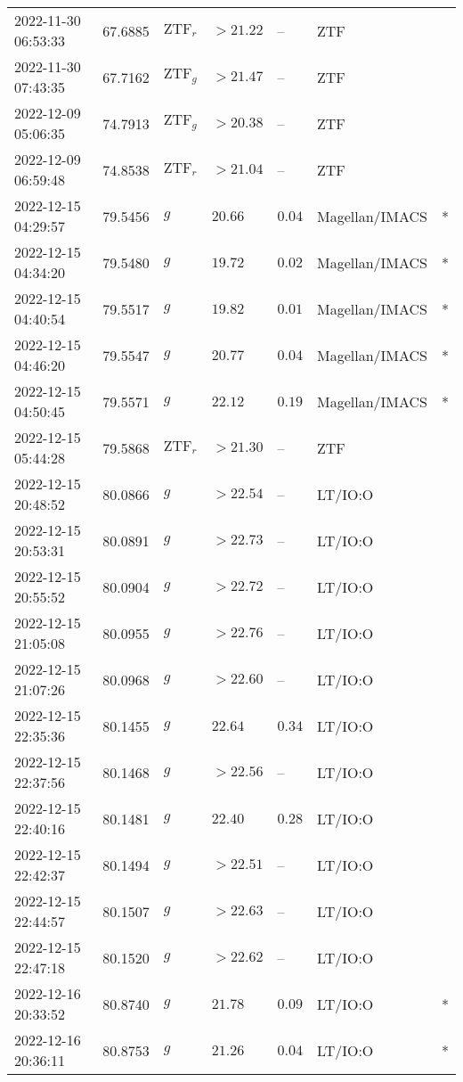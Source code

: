 \documentclass{nature_plusfigure}
\begin{document}
\begin{supplement}
\begin{center}
\begin{longtable}{lllllll}
2022-11-30 06:53:33 & 67.6885 & $\mathrm{ZTF}_{r}$ & $>21.22$ & -- & ZTF &  \\ 
2022-11-30 07:43:35 & 67.7162 & $\mathrm{ZTF}_{g}$ & $>21.47$ & -- & ZTF &  \\ 
2022-12-09 05:06:35 & 74.7913 & $\mathrm{ZTF}_{g}$ & $>20.38$ & -- & ZTF &  \\ 
2022-12-09 06:59:48 & 74.8538 & $\mathrm{ZTF}_{r}$ & $>21.04$ & -- & ZTF &  \\ 
2022-12-15 04:29:57 & 79.5456 & $g$ & $20.66$ & $0.04$ & Magellan/IMACS & * \\ 
2022-12-15 04:34:20 & 79.5480 & $g$ & $19.72$ & $0.02$ & Magellan/IMACS & * \\ 
2022-12-15 04:40:54 & 79.5517 & $g$ & $19.82$ & $0.01$ & Magellan/IMACS & * \\ 
2022-12-15 04:46:20 & 79.5547 & $g$ & $20.77$ & $0.04$ & Magellan/IMACS & * \\ 
2022-12-15 04:50:45 & 79.5571 & $g$ & $22.12$ & $0.19$ & Magellan/IMACS & * \\ 
2022-12-15 05:44:28 & 79.5868 & $\mathrm{ZTF}_{r}$ & $>21.30$ & -- & ZTF &  \\ 
2022-12-15 20:48:52 & 80.0866 & $g$ & $>22.54$ & -- & LT/IO:O &  \\ 
2022-12-15 20:53:31 & 80.0891 & $g$ & $>22.73$ & -- & LT/IO:O &  \\ 
2022-12-15 20:55:52 & 80.0904 & $g$ & $>22.72$ & -- & LT/IO:O &  \\ 
2022-12-15 21:05:08 & 80.0955 & $g$ & $>22.76$ & -- & LT/IO:O &  \\ 
2022-12-15 21:07:26 & 80.0968 & $g$ & $>22.60$ & -- & LT/IO:O &  \\ 
2022-12-15 22:35:36 & 80.1455 & $g$ & $22.64$ & $0.34$ & LT/IO:O &  \\ 
2022-12-15 22:37:56 & 80.1468 & $g$ & $>22.56$ & -- & LT/IO:O &  \\ 
2022-12-15 22:40:16 & 80.1481 & $g$ & $22.40$ & $0.28$ & LT/IO:O &  \\ 
2022-12-15 22:42:37 & 80.1494 & $g$ & $>22.51$ & -- & LT/IO:O &  \\ 
2022-12-15 22:44:57 & 80.1507 & $g$ & $>22.63$ & -- & LT/IO:O &  \\ 
2022-12-15 22:47:18 & 80.1520 & $g$ & $>22.62$ & -- & LT/IO:O &  \\ 
2022-12-16 20:33:52 & 80.8740 & $g$ & $21.78$ & $0.09$ & LT/IO:O & * \\ 
2022-12-16 20:36:11 & 80.8753 & $g$ & $21.26$ & $0.04$ & LT/IO:O & * \\ 

\end{longtable}
\end{center}
\end{supplement}
\end{document}

